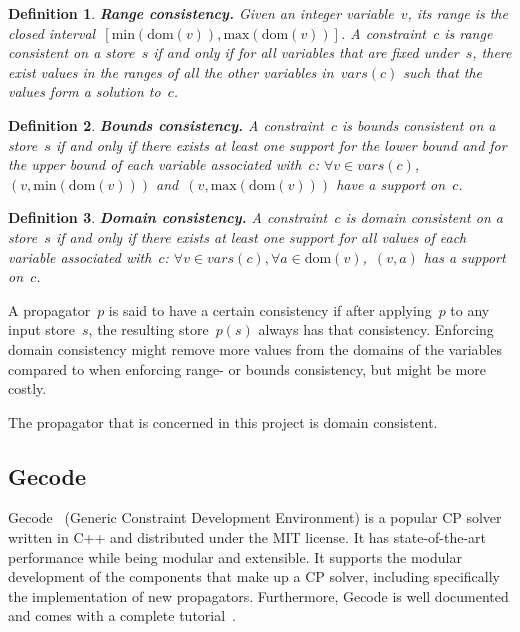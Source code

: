 \documentclass[a4paper,11pt]{article}
\newtheorem{definition}{Definition}
\newcommand{\Dom}[1]{\text{dom}({#1})}
\numberwithin{equation}{section}
\begin{document}
\begin{definition}
  \textbf{Range consistency.} 
  Given an integer variable~$v$, its \emph{range} is the closed 
  interval~$[\text{min}(\Dom{v}),\text{max}(\Dom{v})]$.
  A constraint~$c$ is \emph{range consistent} on a store~$s$
  if and only if for all variables that are fixed under~$s$,
  there exist values in the ranges of all the other variables
  in~$\mathit{vars}(c)$ such that the values form a solution to~$c$.
\end{definition}

\begin{definition}
  \textbf{Bounds consistency.} A constraint~$c$ is \emph{bounds consistent} on a store~$s$ 
  if and only if there exists at least one support for the lower bound 
  and for the upper bound of each variable associated
  with~$c$: $\forall v \in \mathit{vars}(c)$,~$(v,\text{min}(\Dom{v}))$
  and~$(v,\text{max}(\Dom{v}))$ 
  have a support on~$c$.
\end{definition}

\begin{definition}
  \textbf{Domain consistency.} A constraint~$c$ is \emph{domain consistent}
  on a store~$s$  if and only if there exists at least one support for all
  values of each variable associated with~$c$:
  $\forall v \in \mathit{vars}(c), \forall a \in \Dom{v}$,~$(v,a)$ 
  has a support on~$c$.
\end{definition}



A propagator~$p$ is said to have a certain consistency
if after applying~$p$ to any input store~$s$, the resulting store~$p(s)$
always has that consistency. 
Enforcing domain consistency might remove more values from the domains of the variables
compared to when enforcing range- or bounds consistency, but might be more costly.

The propagator that is concerned in this project is domain consistent.

\subsection{Gecode}
\label{bg:gecode}
Gecode~\cite{Gecode} (Generic Constraint Development Environment)
is a popular CP solver written in C++ and
distributed under the MIT license.
It has state-of-the-art performance while being modular and extensible.
It supports the modular development of the components that make up a
CP solver, including specifically the implementation of new propagators.
Furthermore, Gecode is well documented and comes
with a complete tutorial~\cite{Gecode:MPG}.
\end{document}
